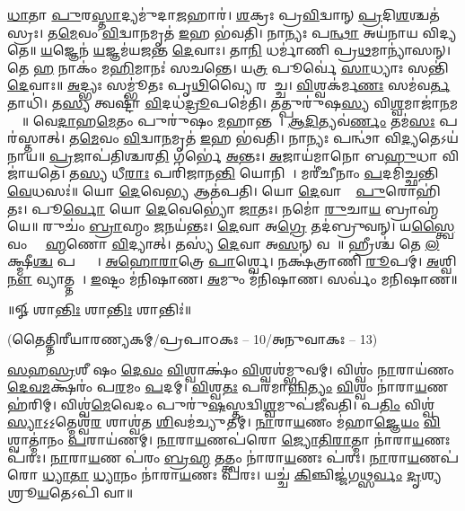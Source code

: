 % 
\ul{𑌧𑌾}𑌤𑌾 \ul{𑌪𑍁}𑌰\ul{𑌸𑍍𑌤𑌾}𑌦𑍍𑌯𑌮𑍁॑𑌦𑌾\ul{𑌜}𑌹𑌾𑌰॑। 
\ul{𑌶}𑌕𑍍𑌰𑌃 𑌪𑍍𑌰\ul{𑌵𑌿}𑌦𑍍𑌵𑌾𑌨𑍍  \ul{𑌪𑍍𑌰}𑌦𑌿\ul{𑌶}𑌶𑍍𑌚𑌤॑𑌸𑍍𑌰𑌃। 
𑌤\ul{𑌮𑍇}𑌵𑌂 \ul{𑌵𑌿}𑌦𑍍𑌵𑌾\ul{𑌨}𑌮𑍃𑌤॑ \ul{𑌇}𑌹 𑌭॑𑌵𑌤𑌿। 
𑌨𑌾𑌨𑍍𑌯𑌃 𑌪\ul{𑌨𑍍𑌥𑌾} 𑌅𑌯॑𑌨𑌾𑌯 𑌵𑌿𑌦𑍍𑌯𑌤𑍇॥ 
% 
\ul{𑌯}𑌜𑍍𑌞𑍇𑌨॑ \ul{𑌯}𑌜𑍍𑌞𑌮॑𑌯𑌜𑌨𑍍𑌤 \ul{𑌦𑍇}𑌵𑌾𑌃। 
𑌤𑌾\ul{𑌨𑌿} 𑌧𑌰𑍍𑌮𑌾॑𑌣𑌿 𑌪𑍍𑌰\ul{𑌥}𑌮𑌾𑌨𑍍𑌯𑌾॑𑌸𑌨𑍍। 
𑌤𑍇 \ul{𑌹} 𑌨𑌾𑌕𑌂॑ 𑌮\ul{𑌹𑌿}𑌮𑌾𑌨𑌃॑ 𑌸𑌚𑌨𑍍𑌤𑍇। 
𑌯\ul{𑌤𑍍𑌰} 𑌪𑍂𑌰𑍍𑌵𑍇॑ \ul{𑌸𑌾}𑌧𑍍𑌯𑌾𑌃 𑌸𑌨𑍍𑌤𑌿॑ \ul{𑌦𑍇}𑌵𑌾𑌃॥ 
% 
\ul{𑌅}𑌦𑍍𑌭𑍍𑌯𑌃 𑌸𑌮𑍍𑌭𑍂॑𑌤𑌃 𑌪𑍃\ul{𑌥𑌿}𑌵𑍍𑌯𑍈 𑌰𑌸𑌾᳚𑌚𑍍𑌚। 
\ul{𑌵𑌿}𑌶𑍍𑌵𑌕॑𑌰𑍍𑌮\ul{𑌣𑌃} 𑌸𑌮॑𑌵\ul{𑌰𑍍𑌤}𑌤𑌾𑌧𑌿॑। 
𑌤\ul{𑌸𑍍𑌯} 𑌤𑍍𑌵𑌷𑍍𑌟𑌾॑ \ul{𑌵𑌿}𑌦𑌧॑\ul{𑌦𑍍𑌰𑍂}𑌪𑌮𑍇॑𑌤𑌿। 
𑌤𑌤𑍍𑌪𑍁𑌰𑍁॑𑌷\ul{𑌸𑍍𑌯} 𑌵𑌿\ul{𑌶𑍍𑌵}𑌮𑌾𑌜𑌾॑\ul{𑌨}𑌮𑌗𑍍𑌰𑍇᳚॥ 
% 
𑌵𑍇\ul{𑌦𑌾}𑌹\ul{𑌮𑍇}𑌤𑌂 𑌪𑍁𑌰𑍁॑𑌷𑌂 \ul{𑌮}𑌹𑌾𑌨𑍍𑌤𑌮𑍍᳚। 
\ul{𑌆}\ul{𑌦𑌿}𑌤𑍍𑌯𑌵॑\ul{𑌰𑍍𑌣𑌂} 𑌤𑌮॑\ul{𑌸𑌃} 𑌪𑌰॑𑌸𑍍𑌤𑌾𑌤𑍍। 
𑌤\ul{𑌮𑍇}𑌵𑌂 \ul{𑌵𑌿}𑌦𑍍𑌵𑌾\ul{𑌨}𑌮𑍃𑌤॑ \ul{𑌇}𑌹 𑌭॑𑌵𑌤𑌿। 
𑌨𑌾𑌨𑍍𑌯𑌃 𑌪𑌨𑍍𑌥𑌾॑ 𑌵𑌿\ul{𑌦𑍍𑌯}𑌤𑍇𑌽𑌯॑𑌨𑌾𑌯॥ 
% 
\ul{𑌪𑍍𑌰}𑌜𑌾𑌪॑𑌤𑌿𑌶𑍍𑌚𑌰\ul{𑌤𑌿} 𑌗𑌰𑍍𑌭𑍇॑ \ul{𑌅}𑌨𑍍𑌤𑌃। 
\ul{𑌅}𑌜𑌾𑌯॑𑌮𑌾𑌨𑍋 𑌬\ul{𑌹𑍁}𑌧𑌾 𑌵𑌿𑌜𑌾॑𑌯𑌤𑍇। 
𑌤\ul{𑌸𑍍𑌯} 𑌧𑍀\ul{𑌰𑌾𑌃} 𑌪𑌰𑌿॑𑌜𑌾𑌨\ul{𑌨𑍍𑌤𑌿} 𑌯𑍋𑌨𑌿𑌮𑍍᳚। 
𑌮𑌰𑍀॑𑌚𑍀𑌨𑌾𑌂 \ul{𑌪}𑌦𑌮𑌿॑𑌚𑍍𑌛𑌨𑍍𑌤𑌿 \ul{𑌵𑍇}𑌧𑌸𑌃॑॥ 
% 
𑌯𑍋 \ul{𑌦𑍇}𑌵𑍇\ul{𑌭𑍍𑌯} 𑌆𑌤॑𑌪𑌤𑌿। 
𑌯𑍋 \ul{𑌦𑍇}𑌵𑌾𑌨𑌾𑌂᳚ \ul{𑌪𑍁}𑌰𑍋𑌹𑌿॑𑌤𑌃। 
𑌪𑍂\ul{𑌰𑍍𑌵𑍋} 𑌯𑍋 \ul{𑌦𑍇}𑌵𑍇𑌭𑍍𑌯𑍋॑ \ul{𑌜𑌾}𑌤𑌃। 
𑌨𑌮𑍋॑ \ul{𑌰𑍁}𑌚𑌾\ul{𑌯} 𑌬𑍍𑌰𑌾𑌹𑍍𑌮॑𑌯𑍇॥ 
% 
𑌰𑍁𑌚𑌂॑ \ul{𑌬𑍍𑌰𑌾}𑌹𑍍𑌮𑌂 \ul{𑌜}𑌨𑌯॑𑌨𑍍𑌤𑌃। 
\ul{𑌦𑍇}𑌵𑌾 𑌅\ul{𑌗𑍍𑌰𑍇} 𑌤𑌦॑𑌬𑍍𑌰𑍁𑌵𑌨𑍍। 
𑌯\ul{𑌸𑍍𑌤𑍍𑌵𑍈}𑌵𑌂 𑌬𑍍𑌰𑌾᳚\ul{𑌹𑍍𑌮}𑌣𑍋 \ul{𑌵𑌿}𑌦𑍍𑌯𑌾𑌤𑍍। 
𑌤𑌸𑍍𑌯॑ \ul{𑌦𑍇}𑌵𑌾 𑌅\ul{𑌸}𑌨𑍍 𑌵𑌶𑍇᳚॥ 
% 
𑌹𑍍𑌰𑍀𑌶𑍍𑌚॑ 𑌤𑍇 \ul{𑌲}𑌕𑍍𑌷𑍍𑌮𑍀\ul{𑌶𑍍𑌚} 𑌪𑌤𑍍𑌨𑍍𑌯𑍗᳚। 
\ul{𑌅}\ul{𑌹𑍋}\ul{𑌰𑌾}𑌤𑍍𑌰𑍇 \ul{𑌪𑌾}𑌰𑍍𑌶𑍍𑌵𑍇। 
𑌨𑌕𑍍𑌷॑𑌤𑍍𑌰𑌾𑌣𑌿 \ul{𑌰𑍂}𑌪𑌮𑍍। 
\ul{𑌅}𑌶𑍍𑌵𑌿\ul{𑌨𑍗} 𑌵𑍍𑌯𑌾𑌤𑍍𑌤𑌮𑍍᳚। 
\ul{𑌇}𑌷𑍍𑌟𑌂 𑌮॑𑌨𑌿𑌷𑌾𑌣। 
\ul{𑌅}𑌮𑍁𑌂 𑌮॑𑌨𑌿𑌷𑌾𑌣। 
𑌸𑌰𑍍𑌵𑌂॑ 𑌮𑌨𑌿𑌷𑌾𑌣॥ 
% 
\centerline{॥𑍐 𑌶𑌾\ul{𑌨𑍍𑌤𑌿𑌃} 𑌶𑌾\ul{𑌨𑍍𑌤𑌿𑌃} 𑌶𑌾𑌨𑍍𑌤𑌿𑌃॑॥}

\centerline{\normalsize(𑌤𑍈𑌤𑍍𑌤𑌿𑌰𑍀𑌯𑌾𑌰𑌣𑍍𑌯𑌕𑌮𑍍/𑌪𑍍𑌰𑌪𑌾𑌠𑌕𑌃 – 10/𑌅𑌨𑍁𑌵𑌾𑌕𑌃 – 13)}

\ul{𑌸}\ul{𑌹}\ul{𑌸𑍍𑌰}𑌶𑍀\sr%
𑌷𑌂 \ul{𑌦𑍇}\ul{𑌵𑌂} \ul{𑌵𑌿}𑌶𑍍𑌵𑌾𑌕𑍍𑌷𑌂॑ \ul{𑌵𑌿}𑌶𑍍𑌵𑌶॑𑌮𑍍𑌭𑍁𑌵𑌮𑍍। 𑌵𑌿𑌶𑍍𑌵𑌂॑ \ul{𑌨𑌾}𑌰𑌾𑌯॑𑌣𑌂 \ul{𑌦𑍇}\ul{𑌵}\ul{𑌮}𑌕𑍍𑌷𑌰𑌂॑ 𑌪\ul{𑌰}𑌮𑌂 \ul{𑌪}𑌦𑌮𑍍। 
\ul{𑌵𑌿}𑌶𑍍𑌵\ul{𑌤𑌃} 𑌪𑌰॑𑌮𑌾\ul{𑌨𑍍𑌨𑌿}\ul{𑌤𑍍𑌯𑌂} \ul{𑌵𑌿}𑌶𑍍𑌵𑌂 𑌨𑌾॑𑌰𑌾\ul{𑌯}𑌣 𑌹॑𑌰𑌿𑌮𑍍। 𑌵𑌿𑌶𑍍𑌵॑\ul{𑌮𑍇}𑌵𑍇𑌦𑌂 𑌪𑍁𑌰𑍁॑\ul{𑌷}𑌸𑍍𑌤𑌦𑍍𑌵𑌿\ul{𑌶𑍍𑌵}𑌮𑍁𑌪॑𑌜𑍀𑌵𑌤𑌿। 
𑌪\ul{𑌤𑌿𑌂}   𑌵𑌿𑌶𑍍𑌵॑\ul{𑌸𑍍𑌯𑌾}𑌽॒𑌽॒𑌤𑍍𑌮𑍇𑌶𑍍𑌵॑\ul{𑌰}\ul{} 𑌶𑌾𑌶𑍍𑌵॑𑌤 \ul{𑌶𑌿}𑌵𑌮॑𑌚𑍍𑌯𑍁𑌤𑌮𑍍। \ul{𑌨𑌾}𑌰𑌾\ul{𑌯}𑌣𑌂 𑌮॑𑌹𑌾\ul{𑌜𑍍𑌞𑍇}\ul{𑌯𑌂} \ul{𑌵𑌿}𑌶𑍍𑌵𑌾𑌤𑍍𑌮𑌾॑𑌨𑌂 \ul{𑌪}𑌰𑌾𑌯॑𑌣𑌮𑍍। \ul{𑌨𑌾}𑌰𑌾\ul{𑌯}𑌣𑌪॑𑌰𑍋 \ul{𑌜𑍍𑌯𑍋}\ul{𑌤𑌿}\ul{𑌰𑌾}𑌤𑍍𑌮𑌾 𑌨𑌾॑𑌰𑌾\ul{𑌯}𑌣𑌃 𑌪॑𑌰𑌃। \ul{𑌨𑌾}𑌰𑌾\ul{𑌯}𑌣 𑌪॑𑌰𑌂 \ul{𑌬𑍍𑌰}\ul{𑌹𑍍𑌮} \ul{𑌤}𑌤𑍍𑌤𑍍𑌵𑌂 𑌨𑌾॑𑌰𑌾\ul{𑌯}𑌣𑌃 𑌪॑𑌰𑌃। \ul{𑌨𑌾}𑌰𑌾\ul{𑌯}𑌣𑌪॑𑌰𑍋 \ul{𑌧𑍍𑌯𑌾}\ul{𑌤𑌾} \ul{𑌧𑍍𑌯𑌾}𑌨𑌂 𑌨𑌾॑𑌰𑌾\ul{𑌯}𑌣𑌃 𑌪॑𑌰𑌃। 𑌯𑌚𑍍𑌚॑ \ul{𑌕𑌿}𑌞𑍍𑌚𑌿𑌜𑍍𑌜॑𑌗\ul{𑌥𑍍𑌸}\ul{𑌰𑍍𑌵𑌂} \ul{𑌦𑍃}𑌶𑍍𑌯𑌤𑍇᳚ 𑌶𑍍𑌰𑍂\ul{𑌯}𑌤𑍇𑌽𑌪𑌿॑ 𑌵𑌾॥ 


